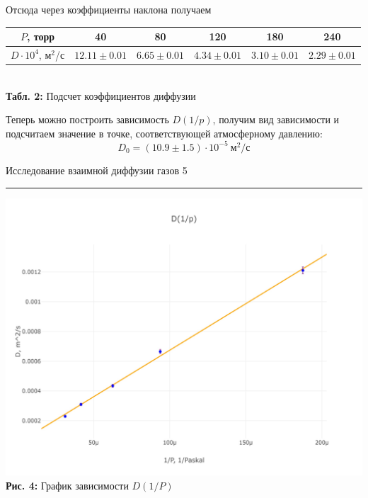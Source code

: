 \documentclass[12pt,a4paper]{scrartcl}
\begin{document}
	Отсюда через коэффициенты наклона получаем

	\begin{center}
		\begin{tabular}{|c|c|c|c|c|c|}
			\hline
			$P$, торр & 40 & 80 & 120 & 180 & 240 \\\hline
			$D \cdot 10^{4}$, м$^2$/с & $12.11 \pm 0.01$ & $6.65 \pm 0.01$ & $4.34 \pm 0.01$ & $3.10 \pm 0.01$ & $2.29 \pm 0.01$\\\hline
		\end{tabular}
		\\\textbf{Табл. 2:} Подсчет коэффициентов диффузии
	\end{center}

	Теперь можно построить зависимость $D(1/p)$, получим вид зависимости и подсчитаем значение в точке, соответствующей атмосферному давлению:
	$$D_0 = (10.9 \pm 1.5) \cdot 10^{-5}\ \text{м}^2/\text{с}$$

	
	\newpage
	
	\begin{flushleft}
		\footnotesize{Исследование взаимной диффузии газов} \hspace{\fill} \footnotesize{5}
		\\[-0.3cm]\noindent\rule{\textwidth}{0.3pt}
	\end{flushleft}

	
	\begin{center}
		\includegraphics[scale=0.15]{PIC_4.jpg}
		\\\textbf{Рис. 4:} График зависимости $D(1/P)$
	\end{center}
	
\end{document}
